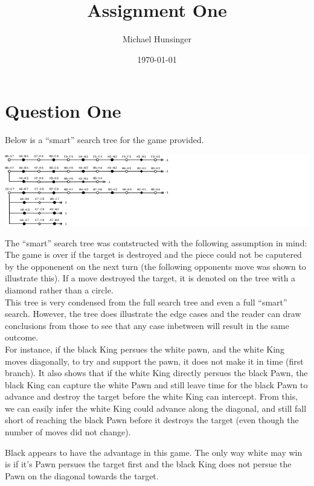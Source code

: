 \documentclass[a4paper]{article}
\author{Michael Hunsinger}
\date{\today}
\title{Assignment One}
\begin{document}
\maketitle

\section*{Question One}
\label{sec-1}
Below is a ``smart'' search tree for the game provided. \\

\begin{center}
\includegraphics[width=.9\linewidth]{./multimedia/search-tree.png}
\end{center}

The ``smart'' search tree was contstructed with the following assumption in
mind: The game is over if the target is destroyed and the piece could not
be caputered by the opponenent on the next turn (the following opponents move
was shown to illustrate this). If a move destroyed the target, it is denoted 
on the tree with a diamond rather than a circle. \\

This tree is very condensed from the full search tree and even a full ``smart''
search. However, the tree does illustrate the edge cases and the reader can
draw conclusions from those to see that any case inbetween will result in the
same outcome. \\

For instance, if the black King persues the white pawn, and the white King
moves diagonally, to try and support the pawn, it does not make it in time
(first branch). It also shows that if the white King directly persues the
black Pawn, the black King can capture the white Pawn and still leave time for
the black Pawn to advance and destroy the target before the white King can
intercept. From this, we can easily infer the white King could advance along
the diagonal, and still fall short of reaching the black Pawn before
it destroys the target (even though the number of moves did not change).

Black appears to have the advantage in this game. The only way white may win
is if it's Pawn persues the target first and the black King does not persue
the Pawn on the diagonal towards the target.
\end{document}
